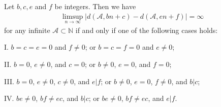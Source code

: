 \documentclass[10pt,a4paper]{amsart}
\begin{document}
\begin{theorem}\label{thm2}
Let $b,c,e$ and $f$ be integers. Then we have
\begin{align}\label{eq4}
\limsup_{n\rightarrow\infty}|d(\mathcal{A},bn+c)-d(\mathcal{A},en+f)|=\infty
\end{align}
for any infinite $\mathcal{A}\subset \mathbb{N}$ 
if and only if one of the following cases holds:

I. $b=c=e=0$ and $f\neq 0$; or $b=c=f=0$ and $e\neq 0$;

II. $b=0$, $e\neq 0$, and $c=0$; or $b\neq 0$, $e= 0$, and $f=0$;

III. $b=0$, $e\neq 0$, $c\neq 0$, and $e|f$; or $b\neq 0$, $e= 0$, $f\neq 0$, and $b|c$;

IV. $be \neq 0$, $bf\neq ec$, and $b|c$; or $be \neq 0$, $bf\neq ec$, and $e|f$.
\end{theorem}
\end{document}
